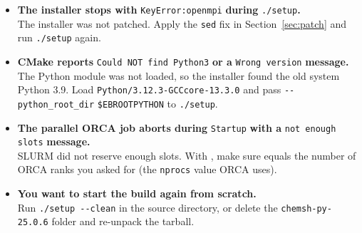 \documentclass[12pt,a4paper]{article}
\begin{document}
\begin{itemize}[leftmargin=1.2em]
  \item \textbf{The installer stops with} \texttt{KeyError:\textquotesingle openmpi\textquotesingle} \textbf{during}         \texttt{./setup}\textbf{.}\\
        The installer was not patched. Apply the \texttt{sed} fix in
        Section~\ref{sec:patch} and run \texttt{./setup} again.

  \item \textbf{CMake reports} \texttt{Could NOT find Python3}
        \textbf{or a} \texttt{Wrong version} \textbf{message.}\\
        The Python module was not loaded, so the installer found the old system
        Python 3.9. Load \texttt{Python/3.12.3-GCCcore-13.3.0} and pass
        \texttt{-\hspace{0mm}-python\_root\_dir} \texttt{\$EBROOTPYTHON} to \texttt{./setup}.

  \item \textbf{The parallel ORCA job aborts during} \texttt{Startup}
        \textbf{with a} \texttt{not enough slots} \textbf{message.}\\
        SLURM did not reserve enough slots. With , make sure
         equals the number of ORCA ranks you asked for (the
        \texttt{nprocs} value ORCA uses).

  \item \textbf{You want to start the build again from scratch.}\\
        Run \texttt{./setup -\hspace{0mm}-clean} in the source directory, or delete the
        \texttt{chemsh-py-25.0.6} folder and re-unpack the tarball.
\end{itemize}
\end{document}
